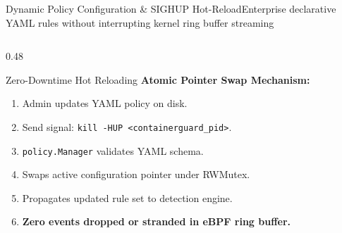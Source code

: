 \documentclass[aspectratio=169,10pt]{beamer}
\begin{document}
\begin{frame}{Dynamic Policy Configuration \& SIGHUP Hot-Reload}{Enterprise declarative YAML rules without interrupting kernel ring buffer streaming}
\begin{columns}[T]
    \begin{column}{0.48\textwidth}
      \begin{exampleblock}{Zero-Downtime Hot Reloading}
        \scriptsize
        \textbf{Atomic Pointer Swap Mechanism:}
        \begin{enumerate}
          \item Admin updates YAML policy on disk.
          \item Send signal: \texttt{kill -HUP <containerguard\_pid>}.
          \item \texttt{policy.Manager} validates YAML schema.
          \item Swaps active configuration pointer under RWMutex.
          \item Propagates updated rule set to detection engine.
          \item \textbf{Zero events dropped or stranded in eBPF ring buffer.}
        \end{enumerate}
      \end{exampleblock}
    \end{column}
  \end{columns}
\end{frame}
\end{document}

